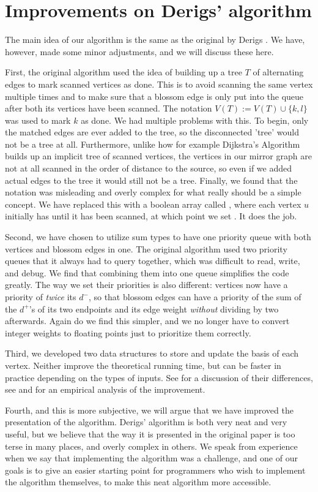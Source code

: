 \section{Improvements on Derigs' algorithm}
The main idea of our algorithm is the same as the original by Derigs \cite{source:derigs_shortest_odd_path}. We have, however, made some minor adjustments, and we will discuss these here.

First, the original algorithm used the idea of building up a tree $T$ of alternating edges to mark scanned vertices as done. This is to avoid scanning the same vertex multiple times and to make sure that a blossom edge is only put into the queue after both its vertices have been scanned. The notation $V(T) := V(T) \cup \{k,l\}$ was used to mark $k$ as done. We had multiple problems with this. To begin, only the matched edges are ever added to the tree, so the disconnected 'tree' would not be a tree at all. Furthermore, unlike how for example Dijkstra's Algorithm builds up an implicit tree of scanned vertices, the vertices in our mirror graph are not at all scanned in the order of distance to the source, so even if we added actual edges to the tree it would still not be a tree. Finally, we found that the notation was misleading and overly complex for what really should be a simple concept. We have replaced this with a boolean array called , where each vertex $u$ initially has  until it has been scanned, at which point we set . It does the job.

Second, we have chosen to utilize sum types to have one priority queue with both vertices and blossom edges in one. The original algorithm used two priority queues that it always had to query together, which was difficult to read, write, and debug. We find that combining them into one queue simplifies the code greatly. The way we set their priorities is also different: vertices now have a priority of \emph{twice} its $d^-$, so that blossom edges can have a priority of the sum of the $d^+$'s of its two endpoints and its edge weight \emph{without} dividing by two afterwards. Again do we find this simpler, and we no longer have to convert integer weights to floating points just to prioritize them correctly.

Third, we developed two data structures to store and update the basis of each vertex. Neither improve the theoretical running time, but can be faster in practice depending on the types of inputs. See  for a discussion of their differences, see and  for an empirical analysis of the improvement.
 
Fourth, and this is more subjective, we will argue that we have improved the presentation of the algorithm. Derigs' algorithm is both very neat and very useful, but we believe that the way it is presented in the original paper \cite{source:derigs_shortest_odd_path} is too terse in many places, and overly complex in others. We speak from experience when we say that implementing the algorithm was a challenge, and one of our goals is to give an easier starting point for programmers who wish to implement the algorithm themselves, to make this neat algorithm more accessible.
